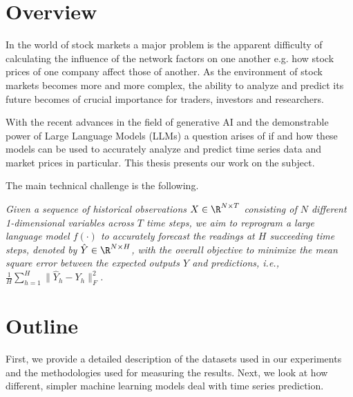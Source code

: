\section{Overview}
In the world of stock markets a major problem is the apparent difficulty of calculating the influence of the network factors on one another e.g. how stock prices of one company affect those of another. As the environment of stock markets becomes more and more complex, the ability to analyze and predict its future becomes of crucial importance for traders, investors and researchers.

With the recent advances in the field of generative AI and the demonstrable power of Large Language Models (LLMs) a question arises of if and how these models can be used to accurately analyze and predict time series data and market prices in particular. This thesis presents our work on the subject.

The main technical challenge is the following.

\textit{Given a sequence of historical observations \(X \in \R^{N\times T}\)
	consisting of \(N\) different 1-dimensional variables across \(T\) time steps, we aim to reprogram a large
	language model \(f(\cdot)\) to accurately forecast the readings at \(H\) succeeding time steps, denoted by \(\hat{Y} \in \R^{N\times H}\),
	with the overall objective to minimize the mean square error between the expected outputs \(Y\) and predictions, i.e., \(\frac1H \sum_{h=1}^H \| \hat{Y}_h - Y_h \|_F^2 \).} \cite{reprogramming_llm}

\section{Outline} %
First, we provide a detailed description of the datasets used in our experiments and the methodologies used for measuring the results.
Next, we look at how different, simpler machine learning models deal with time series prediction.


